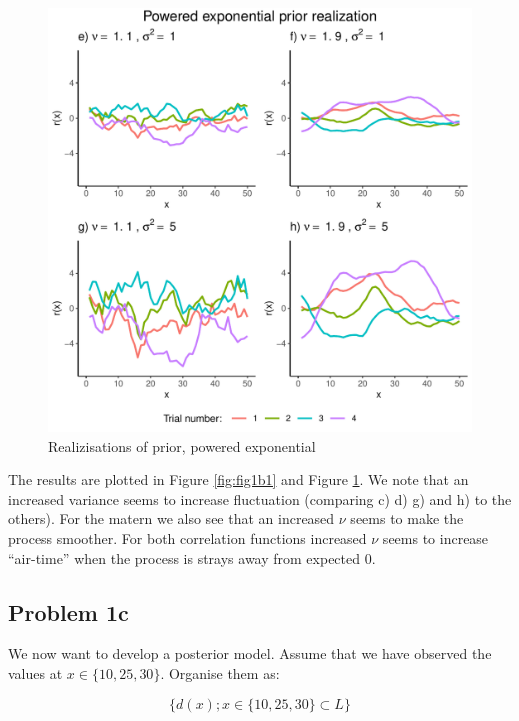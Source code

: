 \documentclass[]{article}
\begin{document}
\begin{figure}

{\centering \includegraphics{Exercise_1_files/figure-latex/fig1b2-1} 

}

\caption{\label{fig:fig1b2} Realizisations of prior, powered exponential}\label{fig:fig1b2}
\end{figure}

The results are plotted in Figure \ref{fig:fig1b1} and Figure
\ref{fig:fig1b2}. We note that an increased variance seems to increase
fluctuation (comparing c) d) g) and h) to the others). For the matern we
also see that an increased \(\nu\) seems to make the process smoother.
For both correlation functions increased \(\nu\) seems to increase
``air-time'' when the process is strays away from expected 0.

\newpage

\subsection{Problem 1c}\label{problem-1c}

We now want to develop a posterior model. Assume that we have observed
the values at \(x \in \lbrace 10, 25, 30 \rbrace\). Organise them as:

\begin{equation}
    \lbrace d(x); x \in \lbrace 10, 25, 30 \rbrace \subset L  \rbrace 
\end{equation}
\end{document}
